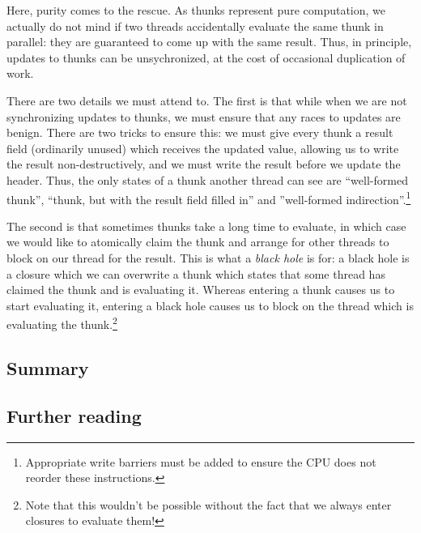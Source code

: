 Here, purity comes to the rescue.  As thunks represent pure computation,
we actually do not mind if two threads accidentally evaluate the same
thunk in parallel: they are guaranteed to come up with the same result.
Thus, in principle, updates to thunks can be unsychronized, at the cost
of occasional duplication of work.

There are two details we must attend to.  The first is that while when
we are not synchronizing updates to thunks, we must ensure that any
races to updates are benign.  There are two tricks to ensure this: we
must give every thunk a result field (ordinarily unused) which receives
the updated value, allowing us to write the result non-destructively,
and we must write the result before we update the header.  Thus, the
only states of a thunk another thread can see are ``well-formed thunk'',
``thunk, but with the result field filled in'' and ''well-formed
indirection''.\footnote{Appropriate write barriers must be added to
    ensure the CPU does not reorder these instructions.}

The second is that sometimes thunks take a long time to evaluate, in
which case we would like to atomically claim the thunk and arrange for
other threads to block on our thread for the result.  This is what
a \emph{black hole} is for: a black hole is a closure which we can
overwrite a thunk which states that some thread has claimed the thunk
and is evaluating it.  Whereas entering a thunk causes us to start
evaluating it, entering a black hole causes us to block on the thread
which is evaluating the thunk.\footnote{Note that this wouldn't be
possible without the fact that we always enter closures to evaluate them!}


\subsection{Summary}

\subsection{Further reading}
